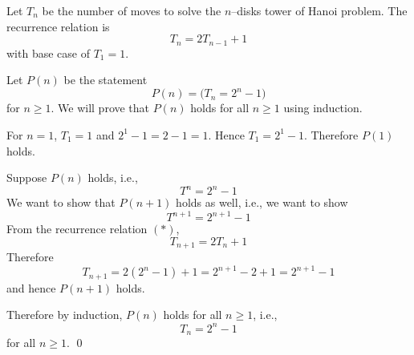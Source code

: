 Let $T_n$ be the number of moves to solve the $n$--disks tower of Hanoi
problem.
The recurrence relation is
\[
T_n = 2 T_{n-1} + 1 \tag{*}
\]
with base case of $T_1 = 1$.

Let $P(n)$ be the statement
\[
P(n) = \biggl( T_n = 2^n - 1 \biggr)
\]
for $n \geq 1$.
We will prove that $P(n)$ holds for all $n \geq 1$ using
induction.

For $n = 1$, $T_1 = 1$
and $2^1 - 1 = 2 - 1 = 1$.
Hence $T_1 = 2^1 - 1$. Therefore $P(1)$ holds.

Suppose $P(n)$ holds, i.e., 
\[
T^n = 2^n - 1
\]
We want to show that $P(n + 1)$ holds as well, i.e., we want to show
\[
T^{n + 1} = 2^{n + 1} - 1
\]
From the recurrence relation $(*)$,
\[
T_{n + 1} = 2T_n + 1
\]
Therefore
\[
T_{n + 1} = 2(2^n - 1) + 1 = 2^{n + 1} - 2 + 1 = 2^{n+1} - 1
\]
and hence $P(n + 1)$ holds.

Therefore by induction, $P(n)$ holds for all $n \geq 1$, i.e.,
\[
T_n = 2^n - 1
\]
for all $n \geq 1$.
\qed



